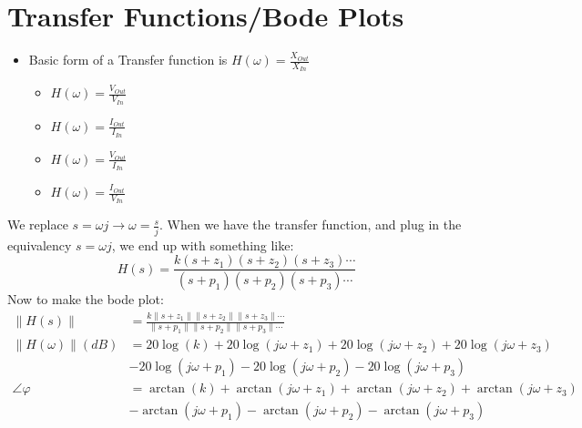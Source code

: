\section*{Transfer Functions/Bode Plots} \label{sec:Bode Plots}
	\begin{itemize}[noitemsep, nolistsep]
		\item Basic form of a Transfer function is $H \left( \omega \right) = \frac{X_{Out}}{X_{In}}$
		\begin{itemize}[noitemsep, nolistsep]
			\item $H \left( \omega \right) = \frac{V_{Out}}{V_{In}}$
			\item $H \left( \omega \right) = \frac{I_{Out}}{I_{In}}$
			\item $H \left( \omega \right) = \frac{V_{Out}}{I_{In}}$
			\item $H \left( \omega \right) = \frac{I_{Out}}{V_{In}}$
		\end{itemize}
	\end{itemize}
	We replace {\large $s = \omega j \rightarrow \omega = \frac{s}{j}$}. \newline
	When we have the transfer function, and plug in the equivalency $s = \omega j$, we end up with something like:
	\begin{equation*}
		H\left( s \right) = \frac{k \left(s + z_{1} \right) \left(s + z_{2} \right) \left(s + z_{3} \right) \cdots}{\left(s + p_{1} \right) \left(s + p_{2} \right) \left(s + p_{3} \right) \cdots}
	\end{equation*}
	Now to make the bode plot:
	\begin{align*} %
		\lVert H\left( s \right) \rVert &= \frac{k \lVert s + z_{1} \rVert \lVert s + z_{2} \rVert \lVert s + z_{3} \rVert \cdots}{\lVert s + p_{1} \rVert \lVert s + p_{2} \rVert \lVert s + p_{3} \rVert \cdots} \\
		\lVert H\left( \omega \right) \rVert (dB) &= 20\log \left( k \right) + 20\log \left( j\omega + z_{1} \right) + 20\log \left( j\omega + z_{2} \right) + 20\log \left( j\omega + z_{3} \right) \\
		&- 20\log \left( j\omega + p_{1} \right) - 20\log \left( j\omega + p_{2} \right) - 20\log \left( j\omega + p_{3} \right) \\
		\angle \varphi &= \arctan \left( k \right) + \arctan \left( j\omega + z_{1} \right) + \arctan \left( j\omega + z_{2} \right) + \arctan \left( j\omega + z_{3} \right) \\
		&-\arctan \left( j\omega + p_{1} \right) - \arctan \left( j\omega + p_{2} \right) - \arctan \left( j\omega + p_{3} \right) \\
	\end{align*}
